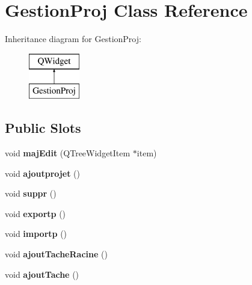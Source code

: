 \hypertarget{class_gestion_proj}{}\section{Gestion\+Proj Class Reference}
\label{class_gestion_proj}
Inheritance diagram for Gestion\+Proj\+:\begin{figure}[H]
\begin{center}
\leavevmode
\includegraphics[height=2.000000cm]{class_gestion_proj}
\end{center}
\end{figure}
\subsection*{Public Slots}
\begin{DoxyCompactItemize}
\item 
\hypertarget{class_gestion_proj_aff06d2e70086a3e66d3e9b28d0f81782}{}void {\bfseries maj\+Edit} (Q\+Tree\+Widget\+Item $\ast$item)\label{class_gestion_proj_aff06d2e70086a3e66d3e9b28d0f81782}

\item 
\hypertarget{class_gestion_proj_a5afde971ab73b1d5dfa9746d89118ed8}{}void {\bfseries ajoutprojet} ()\label{class_gestion_proj_a5afde971ab73b1d5dfa9746d89118ed8}

\item 
\hypertarget{class_gestion_proj_a076c7ef3255c5d8d6c2f302766bf6ad8}{}void {\bfseries suppr} ()\label{class_gestion_proj_a076c7ef3255c5d8d6c2f302766bf6ad8}

\item 
\hypertarget{class_gestion_proj_a97d6f2696bdf8561031a0b9978e64844}{}void {\bfseries exportp} ()\label{class_gestion_proj_a97d6f2696bdf8561031a0b9978e64844}

\item 
\hypertarget{class_gestion_proj_ae75f51b55d9236438640e549848a2a04}{}void {\bfseries importp} ()\label{class_gestion_proj_ae75f51b55d9236438640e549848a2a04}

\item 
\hypertarget{class_gestion_proj_ac775e804e4d9e38ce5801f164fd07928}{}void {\bfseries ajout\+Tache\+Racine} ()\label{class_gestion_proj_ac775e804e4d9e38ce5801f164fd07928}

\item 
\hypertarget{class_gestion_proj_ab75d1fabfd7343a007a96ba0ea734f88}{}void {\bfseries ajout\+Tache} ()\label{class_gestion_proj_ab75d1fabfd7343a007a96ba0ea734f88}

\end{DoxyCompactItemize}


